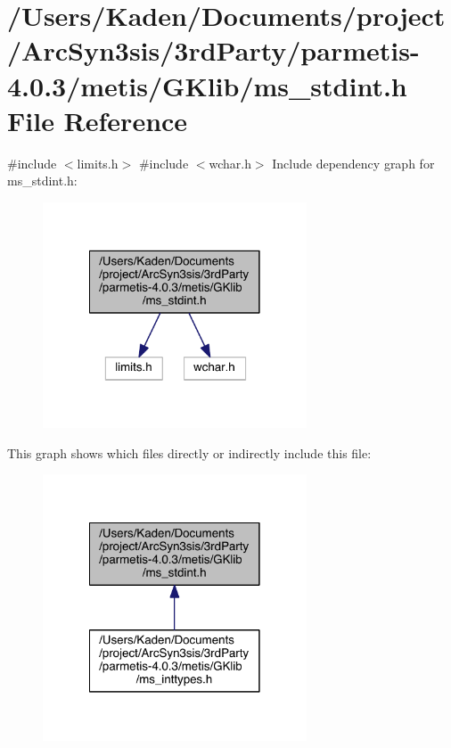 \hypertarget{a00119}{}\section{/\+Users/\+Kaden/\+Documents/project/\+Arc\+Syn3sis/3rd\+Party/parmetis-\/4.0.3/metis/\+G\+Klib/ms\+\_\+stdint.h File Reference}
\label{a00119}
{\ttfamily \#include $<$limits.\+h$>$}\newline
{\ttfamily \#include $<$wchar.\+h$>$}\newline
Include dependency graph for ms\+\_\+stdint.\+h\+:\nopagebreak
\begin{figure}[H]
\begin{center}
\leavevmode
\includegraphics[width=222pt]{a00120}
\end{center}
\end{figure}
This graph shows which files directly or indirectly include this file\+:\nopagebreak
\begin{figure}[H]
\begin{center}
\leavevmode
\includegraphics[width=222pt]{a00121}
\end{center}
\end{figure}
